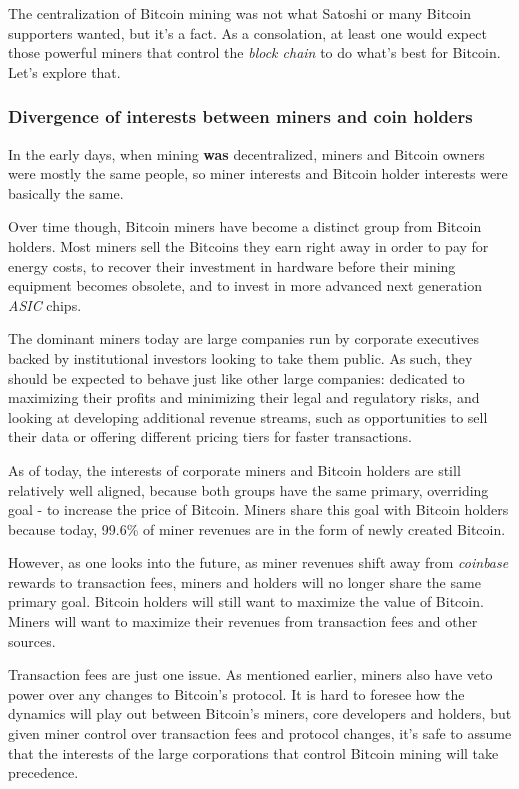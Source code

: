 \documentclass[a4paper,11pt]{article}
\begin{document}
The centralization of Bitcoin mining was not what Satoshi or many Bitcoin supporters wanted, but it's a fact. As a consolation, at least one would expect those powerful miners that control the \textit{block chain} to do what's best for Bitcoin. Let's explore that.

\subsubsection{Divergence of interests between miners and coin holders}

In the early days, when mining \textbf{was} decentralized, miners and Bitcoin owners were mostly the same people, so miner interests and Bitcoin holder interests were basically the same. 

Over time though, Bitcoin miners have become a distinct group from Bitcoin holders. Most miners sell the Bitcoins they earn right away in order to pay for energy costs, to recover their investment in hardware before their mining equipment becomes obsolete, and to invest in more advanced next generation \textit{ASIC} chips.

The dominant miners today are large companies run by corporate executives backed by institutional investors looking to take them public. As such, they should be expected to behave just like other large companies: dedicated to maximizing their profits and minimizing their legal and regulatory risks, and looking at developing additional revenue streams, such as opportunities to sell their data or offering different pricing tiers for faster transactions. 

As of today, the interests of corporate miners and Bitcoin holders are still relatively well aligned, because both groups have the same primary, overriding goal - to increase the price of Bitcoin. Miners share this goal with Bitcoin holders because today, 99.6\% of miner revenues are in the form of newly created Bitcoin.

However, as one looks into the future, as miner revenues shift away from \textit{coinbase} rewards to transaction fees, miners and holders will no longer share the same primary goal. Bitcoin holders will still want to maximize the value of Bitcoin. Miners will want to maximize their revenues from transaction fees and other sources.

Transaction fees are just one issue. As mentioned earlier, miners also have veto power over any changes to Bitcoin's protocol. It is hard to foresee how the dynamics will play out between Bitcoin's miners, core developers and holders, but given miner control over transaction fees and protocol changes, it's safe to assume that the interests of the large corporations that control Bitcoin mining will take precedence.
\end{document}
